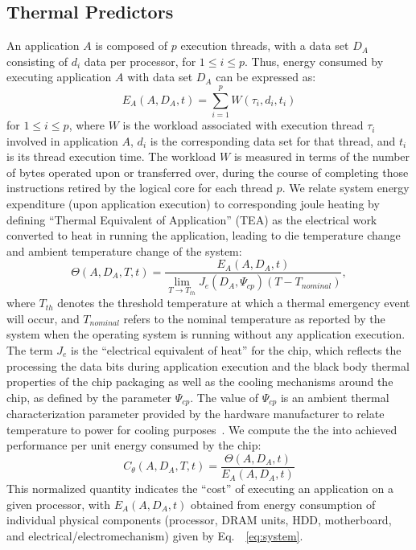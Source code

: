 \documentclass[times, 10pt,twocolumn]{IEEEtran}
\newcommand{\equationname}{Eq.\ }
\begin{document}
\subsection{Thermal Predictors}
\label{sec:therm-pred-design} 
An application $A$ is composed of $p$ execution threads, with a data set
$D_{A}$ consisting of $d_{i}$ data per processor, for $1\leq i \leq
p$. Thus, energy consumed by executing application $A$ with data set
$D_{A}$ can be expressed as:
\begin{equation}
\label{eq:eworkload} 
E_{A}(A,D_{A},t) = \displaystyle \sum_{i=1}^{p}W(\tau_{i},d_{i},t_{i})
\end{equation}
for $1\leq i \leq p$, where $W$ is the workload associated with
execution thread $\tau_{i}$ involved in application $A$, $d_{i}$ is the
corresponding data set for that thread, and $t_{i}$ is its thread
execution time.  The workload $W$ is measured in terms of the number of
bytes operated upon or transferred over, during the course of completing
those instructions retired by the logical core for each thread $p$. We 
relate system energy expenditure (upon application execution)
to corresponding joule heating by defining ``Thermal Equivalent of
Application'' (TEA) as the electrical work converted to heat in running
the application, leading to die temperature change and ambient
temperature change of the system:
\begin{equation}
\label{eq:tea} \Theta(A, D_{A}, T, t) =
\frac{E_{A}(A, D_{A}, t)}{\displaystyle \lim_{T \to T_{th}} J_e(D_{A}, \Psi_{cp}) (T -T_{nominal})},
\end{equation} 
where $T_{th}$ denotes the threshold temperature at which a thermal
emergency event will occur, and $T_{nominal}$ refers to the nominal
temperature as reported by the system when the operating system is
running without any application execution.  The term $J_{e}$ is the
``electrical equivalent of heat'' for the chip, which reflects the
processing the data bits during application execution and the black
body thermal properties of the chip packaging as well as the cooling
mechanisms around the chip, as defined by the parameter $\Psi_{cp}$.
The value of $\Psi_{cp}$ is an ambient thermal characterization
parameter provided by the hardware manufacturer to relate temperature to
power for cooling purposes~\cite{Intel2006}.   We compute the 
the into achieved performance per unit energy consumed by the
chip:
\begin{equation}
\label{eq:thermcost} 
C_{\theta}(A, D_{A}, T, t)=\frac{\Theta (A, D_{A}, t)}{E_{A}(A, D_{A}, t)}
\end{equation}
This normalized quantity indicates the ``cost'' of executing an
application on a given processor, with $E_{A}(A, D_{A}, t)$ obtained
from energy consumption of individual physical components (processor,
DRAM units, HDD, motherboard, and electrical/electromechanism) given by
\equationname~\eqref{eq:system}.
\end{document}
